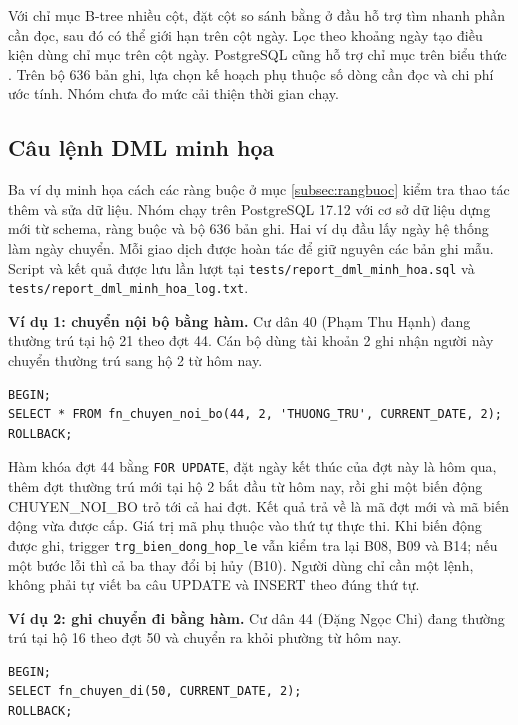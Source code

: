 Với chỉ mục B-tree nhiều cột, đặt cột so sánh bằng ở đầu hỗ trợ tìm nhanh phần cần đọc, sau đó có thể giới hạn trên cột ngày. Lọc theo khoảng ngày tạo điều kiện dùng chỉ mục trên cột ngày. PostgreSQL cũng hỗ trợ chỉ mục trên biểu thức \cite{pgexpressionindex}. Trên bộ 636 bản ghi, lựa chọn kế hoạch phụ thuộc số dòng cần đọc và chi phí ước tính. Nhóm chưa đo mức cải thiện thời gian chạy.

\subsection{Câu lệnh DML minh họa}
\label{subsec:dml}

Ba ví dụ minh họa cách các ràng buộc ở mục \ref{subsec:rangbuoc} kiểm tra thao tác thêm và sửa dữ liệu. Nhóm chạy trên PostgreSQL 17.12 với cơ sở dữ liệu dựng mới từ schema, ràng buộc và bộ 636 bản ghi. Hai ví dụ đầu lấy ngày hệ thống làm ngày chuyển. Mỗi giao dịch được hoàn tác để giữ nguyên các bản ghi mẫu. Script và kết quả được lưu lần lượt tại \texttt{tests/report\_dml\_minh\_hoa.sql} và \texttt{tests/report\_dml\_minh\_hoa\_log.txt}.

\textbf{Ví dụ 1: chuyển nội bộ bằng hàm.} Cư dân 40 (Phạm Thu Hạnh) đang thường trú tại hộ 21 theo đợt 44. Cán bộ dùng tài khoản 2 ghi nhận người này chuyển thường trú sang hộ 2 từ hôm nay.

\begin{lstlisting}[style=sqlvn]
BEGIN;
SELECT * FROM fn_chuyen_noi_bo(44, 2, 'THUONG_TRU', CURRENT_DATE, 2);
ROLLBACK;
\end{lstlisting}

Hàm khóa đợt 44 bằng \texttt{FOR UPDATE}, đặt ngày kết thúc của đợt này là hôm qua, thêm đợt thường trú mới tại hộ 2 bắt đầu từ hôm nay, rồi ghi một biến động CHUYEN\_NOI\_BO trỏ tới cả hai đợt. Kết quả trả về là mã đợt mới và mã biến động vừa được cấp. Giá trị mã phụ thuộc vào thứ tự thực thi. Khi biến động được ghi, trigger \texttt{trg\_bien\_dong\_hop\_le} vẫn kiểm tra lại B08, B09 và B14; nếu một bước lỗi thì cả ba thay đổi bị hủy (B10). Người dùng chỉ cần một lệnh, không phải tự viết ba câu UPDATE và INSERT theo đúng thứ tự.

\textbf{Ví dụ 2: ghi chuyển đi bằng hàm.} Cư dân 44 (Đặng Ngọc Chi) đang thường trú tại hộ 16 theo đợt 50 và chuyển ra khỏi phường từ hôm nay.

\begin{lstlisting}[style=sqlvn]
BEGIN;
SELECT fn_chuyen_di(50, CURRENT_DATE, 2);
ROLLBACK;
\end{lstlisting}

